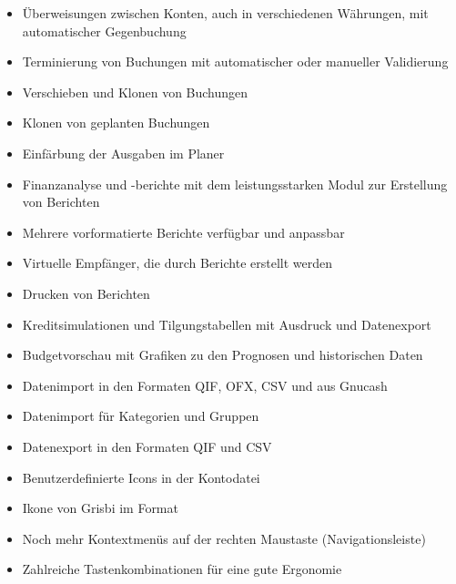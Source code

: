 \begin{itemize}
	\item Überweisungen zwischen Konten, auch in verschiedenen Währungen, mit automatischer Gegenbuchung%
	\item Terminierung von Buchungen mit automatischer oder manueller Validierung%
	\item Verschieben und Klonen von Buchungen%
	\item Klonen von geplanten Buchungen%
	\item Einfärbung der Ausgaben im Planer%
	\item Finanzanalyse und -berichte mit dem leistungsstarken Modul zur Erstellung von Berichten%
	\item Mehrere vorformatierte Berichte verfügbar und anpassbar%
	\item Virtuelle Empfänger, die durch Berichte erstellt werden%
	\item Drucken von Berichten%
	\item Kreditsimulationen und Tilgungstabellen mit Ausdruck und Datenexport%
	\item Budgetvorschau mit Grafiken zu den Prognosen und historischen Daten%
	\item Datenimport in den Formaten \gls{QIF}, \gls{OFX}, \gls{CSV} und aus \gls{Gnucash}%
	\item Datenimport für Kategorien und Gruppen%
	\item Datenexport in den Formaten \gls{QIF} und \gls{CSV}%
	\item Benutzerdefinierte Icons in der Kontodatei%
	\item Ikone von Grisbi im Format %
	\item Noch mehr Kontextmenüs auf der rechten Maustaste (Navigationsleiste)%
	\item Zahlreiche Tastenkombinationen für eine gute Ergonomie%
\end{itemize}


